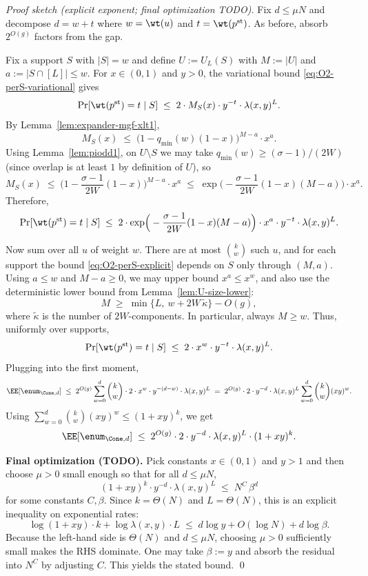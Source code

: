 \begin{proof}[Proof sketch (explicit exponent; final optimization TODO)]
Fix $d\le \mu N$ and decompose $d=w+t$ where $w=\wt(u)$ and $t=\wt(p^{\mathrm{st}})$.
As before, absorb $2^{O(g)}$ factors from the gap.

Fix a support $S$ with $|S|=w$ and define $U:=U_L(S)$ with $M:=|U|$ and $a:=|S\cap[L]|\le w$.
For $x\in(0,1)$ and $y>0$, the variational bound \eqref{eq:O2-perS-variational} gives
\[
\Pr[\wt(p^{\mathrm{st}})=t\mid S]
\;\le\;
2\cdot M_S(x)\cdot y^{-t}\cdot \lambda(x,y)^{L}.
\]
By Lemma~\ref{lem:expander-mgf-xlt1},
\[
M_S(x)\;\le\;\big(1-q_{\min}(w)(1-x)\big)^{M-a}\cdot x^{a}.
\]
Using Lemma~\ref{lem:piodd1}, on $U\setminus S$ we may take $q_{\min}(w)\ge (\sigma-1)/(2W)$ (since overlap is at least $1$
by definition of $U$), so
\[
M_S(x)
\;\le\;
\Big(1-\frac{\sigma-1}{2W}(1-x)\Big)^{M-a}\cdot x^{a}
\;\le\;
\exp\!\Big(-\frac{\sigma-1}{2W}(1-x)(M-a)\Big)\cdot x^{a}.
\]
Therefore,
\begin{equation}
\Pr[\wt(p^{\mathrm{st}})=t\mid S]
\;\le\;
2\cdot \exp\!\Big(-\frac{\sigma-1}{2W}(1-x)(M-a)\Big)\cdot x^{a}\cdot y^{-t}\cdot \lambda(x,y)^{L}.
\label{eq:O2-perS-explicit}
\end{equation}

Now sum over all $u$ of weight $w$.
There are at most $\binom{k}{w}$ such $u$, and for each support the bound \eqref{eq:O2-perS-explicit} depends on $S$ only
through $(M,a)$.
Using $a\le w$ and $M-a\ge 0$, we may upper bound $x^{a}\le x^{w}$, and also use the deterministic lower bound from
Lemma~\ref{lem:U-size-lower}:
\[
M \;\ge\; \min\{L,\ w + 2W\,\widetilde\kappa\} - O(g),
\]
where $\widetilde\kappa$ is the number of $2W$-components.
In particular, always $M\ge w$.
Thus, uniformly over supports,
\[
\Pr[\wt(p^{\mathrm{st}})=t\mid S]
\;\le\;
2\cdot x^{w}\cdot y^{-t}\cdot \lambda(x,y)^{L}.
\]
Plugging into the first moment,
\[
\EE[\enum_{\Cone,d}]
\;\le\;
2^{O(g)}\sum_{w=0}^{d}\binom{k}{w}\cdot 2\cdot x^{w}\cdot y^{-(d-w)}\cdot \lambda(x,y)^{L}
\;=\;
2^{O(g)}\cdot 2\cdot y^{-d}\cdot \lambda(x,y)^{L}\sum_{w=0}^{d}\binom{k}{w}(xy)^{w}.
\]
Using $\sum_{w=0}^{d}\binom{k}{w}(xy)^{w}\le (1+xy)^k$, we get
\[
\EE[\enum_{\Cone,d}]
\;\le\;
2^{O(g)}\cdot 2\cdot y^{-d}\cdot \lambda(x,y)^{L}\cdot (1+xy)^{k}.
\]

\noindent\textbf{Final optimization (TODO).}
Pick constants $x\in(0,1)$ and $y>1$ and then choose $\mu>0$ small enough so that for all $d\le \mu N$,
\[
(1+xy)^{k}\cdot y^{-d}\cdot \lambda(x,y)^{L}
\;\le\;
N^{C}\,\beta^{d}
\]
for some constants $C,\beta$.
Since $k=\Theta(N)$ and $L=\Theta(N)$, this is an explicit inequality on exponential rates:
\[
\log(1+xy)\cdot k + \log\lambda(x,y)\cdot L \;\le\; d\log y + O(\log N) + d\log\beta.
\]
Because the left-hand side is $\Theta(N)$ and $d\le \mu N$, choosing $\mu>0$ sufficiently small makes the RHS dominate.
One may take $\beta:=y$ and absorb the residual into $N^{C}$ by adjusting $C$.
This yields the stated bound.
\qed
\end{proof}

